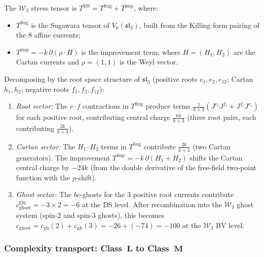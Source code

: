\begin{computation}
\label{comp:w3-stress-tensor}
%
The $\mathcal{W}_3$ stress tensor is
$T^{\mathrm{DS}} = T^{\mathrm{Sug}} + T^{\mathrm{imp}}$,
where:
\begin{itemize}
\item $T^{\mathrm{Sug}}$ is the Sugawara tensor of
 $V_k(\mathfrak{sl}_3)$, built from the Killing form
 pairing of the $8$ affine currents;
\item $T^{\mathrm{imp}} = -k\,\partial(\rho \cdot H)$
 is the improvement term, where $H = (H_1, H_2)$ are
 the Cartan currents and $\rho = (1,1)$ is the Weyl
 vector.
\end{itemize}

Decomposing by the root space structure of
$\mathfrak{sl}_3$ (positive roots $e_1, e_2, e_{12}$;
Cartan $h_1, h_2$; negative roots $f_1, f_2, f_{12}$):
\begin{enumerate}[label=\textup{(\roman*)}]
\item \emph{Root sector:} The $e$--$f$ contractions in
 $T^{\mathrm{Sug}}$ produce terms
 $\frac{1}{k+3}(J^{e_i} J^{f_i} + J^{f_i} J^{e_i})$
 for each positive root, contributing central charge
 $\frac{6k}{k+3}$ (three root pairs, each contributing
 $\frac{2k}{k+3}$).
\item \emph{Cartan sector:} The $H_1$--$H_2$ terms in
 $T^{\mathrm{Sug}}$ contribute $\frac{2k}{k+3}$
 (two Cartan generators). The improvement
 $T^{\mathrm{imp}} = -k\,\partial(H_1 + H_2)$ shifts
 the Cartan central charge by $-24k$ (from the double
 derivative of the free-field two-point function
 with the $\rho$-shift).
\item \emph{Ghost sector:} The $bc$-ghosts for the
 $3$ positive root currents contribute
 $c_{\mathrm{ghost}}^{\mathrm{DS}} = -3 \times 2 = -6$
 at the DS level. After recombination into the
 $\mathcal{W}_3$ ghost system (spin-$2$ and spin-$3$
 ghosts), this becomes $c_{\mathrm{ghost}} =
 c_{\mathrm{gh}}(2) + c_{\mathrm{gh}}(3)
 = -26 + (-74) = -100$
 at the $\mathcal{W}_3$ BV level.
\end{enumerate}
\end{computation}

\subsubsection{Complexity transport:
Class~$\mathbf{L}$ to Class~$\mathbf{M}$}

